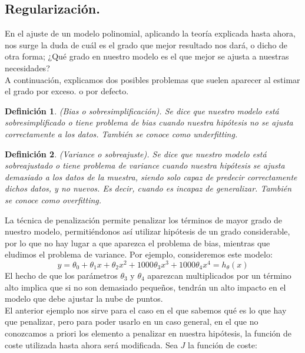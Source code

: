 \documentclass[a4paper,11pt]{article}
\newtheorem{definition}{Definición}
\begin{document}
\subsection{Regularización.}

En el ajuste de un modelo polinomial, aplicando la teoría explicada hasta ahora, nos surge la duda de cuál es el grado que mejor resultado nos dará, o dicho de otra forma; ¿Qué grado en nuestro modelo es el que mejor se ajusta a nuestras necesidades?\\

\noindent
A continuación, explicamos dos posibles problemas que suelen aparecer al estimar el grado por exceso.
o por defecto.\\
\begin{definition}(Bias o sobresimplificación). Se dice que nuestro modelo está
sobresimplificado o tiene problema de bias cuando nuestra hipótesis no se ajusta
correctamente a los datos. También se conoce como \textit{underfitting}.

\end{definition}
\begin{definition}(Variance o sobreajuste). Se dice que nuestro modelo está sobreajustado o tiene problema de variance cuando nuestra hipótesis se ajusta demasiado a los datos de la muestra, siendo solo capaz de predecir correctamente
dichos datos, y no nuevos. Es decir, cuando es incapaz de generalizar. También
se conoce como \textit{overfitting}.


\end{definition}
La técnica de penalización permite penalizar los términos de mayor grado de nuestro modelo, permitiéndonos así utilizar hipótesis de un grado considerable, por lo que no hay lugar a que aparezca el problema de bias, mientras que eludimos el problema de variance. Por ejemplo, consideremos este modelo:
\[
 y=\theta_0+\theta_1 x+\theta_2 x^2+1000\theta_3 x^3+1000\theta_4 x^4 = h_\theta (x)
\]
El hecho de que los parámetros $\theta_3$ y $\theta_4$ aparezcan multiplicados por un término
alto implica que si no son demasiado pequeños, tendrán un alto impacto en el
modelo que debe ajustar la nube de puntos.\\

\noindent
El anterior ejemplo nos sirve para el caso en el que sabemos qué es lo que hay que penalizar, pero para poder usarlo en un caso general, en el que no conozcamos a priori los elemento a penalizar en nuestra hipótesis, la función de coste utilizada hasta ahora será modificada. Sea $J$ la función de coste:
\end{document}
